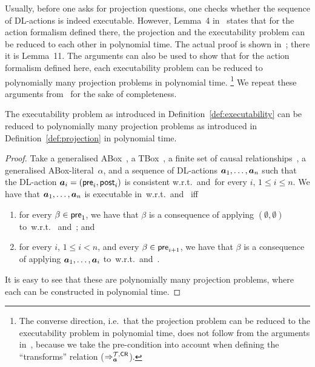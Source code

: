 \noindent
Usually, before one asks for projection questions, one checks whether the
sequence of DL-actions is indeed executable.  However, Lemma~4
in~\cite{BLM+-AAAI05} states that for the action formalism defined there, the
projection and the executability problem can be reduced to each other in
polynomial time.  The actual proof is shown in~\cite{BLM+-LTCS-05-02}; there it
is Lemma~11.  The arguments can also be used to show that for the action
formalism defined here, each executability problem can be reduced to
polynomially many projection problems in polynomial time.%
\footnote{The converse direction, i.e.~that the projection problem can be
reduced to the executability problem in polynomial time, does not follow from
the arguments in~\cite{BLM+-LTCS-05-02}, because we take the pre-condition into
account when defining the \enquote{transforms} relation
($\Rightarrow_{\boldsymbol a}^{\mathcal{T},\mathsf{CR}}$).} We repeat these arguments
from~\cite{BLM+-LTCS-05-02} for the sake of completeness.

\begin{theorem}
    The executability problem as introduced in
    Definition~\ref{def:executability} can be reduced to polynomially many
    projection problems as introduced in Definition~\ref{def:projection} in
    polynomial time.
\end{theorem}

\begin{proof}
    Take a generalised ABox~\Amc, a TBox~\Tmc, a finite set of causal
    relationships~\CR, a generalised ABox-literal~$\alpha$, and a sequence of
    DL-actions $\boldsymbol a_1,\dots,\boldsymbol a_n$ such that the DL-action
    $\boldsymbol a_i=(\mathsf{pre}_i,\mathsf{post}_i)$ is consistent w.r.t.~\Tmc and~\CR for
    every $i$, $1\le i\le n$.
    We have that $\boldsymbol a_1,\dots,\boldsymbol a_n$ is executable in~\Amc w.r.t.~\Tmc and~\CR
    iff
    \begin{enumerate}
        \item for every $\beta\in\mathsf{pre}_1$, we have that $\beta$ is a consequence
            of applying $(\emptyset,\emptyset)$ to~\Amc w.r.t.~\Tmc
            and~\CR; and
        \item for every $i$, $1\le i<n$, and every $\beta\in\mathsf{pre}_{i+1}$, we have
            that $\beta$ is a consequence of applying $\boldsymbol a_1,\dots,\boldsymbol a_i$
            to~\Amc w.r.t.~\Tmc and~\CR.
    \end{enumerate}
    It is easy to see that these are polynomially many projection problems,
    where each can be constructed in polynomial time.
\end{proof}

